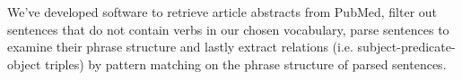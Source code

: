 We've developed software to retrieve article abstracts from PubMed, filter out sentences
that do not contain verbs in our chosen vocabulary, parse sentences to examine their phrase
structure and lastly extract relations (i.e. subject-predicate-object triples) by pattern
matching on the phrase structure of parsed sentences.
